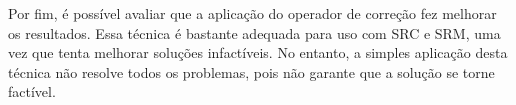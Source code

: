 \documentclass[conference]{IEEEtran}
\begin{document}
Por fim, é possível avaliar que a aplicação do operador de correção fez melhorar os resultados. Essa técnica é bastante adequada para uso com SRC e SRM, uma vez que tenta melhorar soluções infactíveis. No entanto, a simples aplicação desta técnica não resolve todos os problemas, pois não garante que a solução se torne factível.

%
\IEEEpeerreviewmaketitle


%
%

\end{document}
